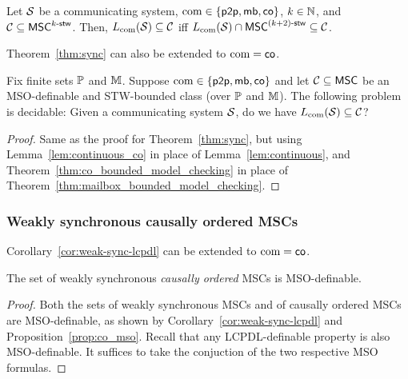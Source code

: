 \documentclass{article}
\begin{document}
\begin{lemma}\label{lem:continuous_co}
Let $\mathcal{S}$ be a communicating system, $\textup{com} \in \{\mathsf{p2p}, \mathsf{mb}, \mathsf{co}\}$,
$k \in \mathbb{N}$, and $\mathcal{C} \subseteq \mathsf{MSC}^{k\textup{-}\mathsf{stw}}$.
Then, $L_{\textup{com}}(\mathcal{S}) \subseteq \mathcal{C}$ iff
$L_{\textup{com}}(\mathcal{S}) \cap \mathsf{MSC}^{(k+2)\textup{-}\mathsf{stw}} \subseteq \mathcal{C}$.
\end{lemma}

Theorem~\ref{thm:sync} can also be extended to $\textup{com} = \mathsf{co}$.

\begin{theorem}\label{thm:sync_co}
Fix finite sets $\mathbb{P}$ and $\mathbb{M}$.
Suppose $\textup{com} \in \{\mathsf{p2p}, \mathsf{mb},\mathsf{co}\}$ and let $\mathcal{C} \subseteq \mathsf{MSC}$ be an MSO-definable and STW-bounded class (over $\mathbb{P}$ and $\mathbb{M}$).
The following problem is decidable:
Given a communicating system $\mathcal{S}$, do we have $L_{\textup{com}}(\mathcal{S}) \subseteq \mathcal{C}$?
\end{theorem}
\begin{proof}
Same as the proof for Theorem~\ref{thm:sync}, but using Lemma~\ref{lem:continuous_co} in place of Lemma~\ref{lem:continuous}, and Theorem~\ref{thm:co_bounded_model_checking} in place of Theorem~\ref{thm:mailbox_bounded_model_checking}.
\end{proof}

\subsubsection{Weakly synchronous causally ordered MSCs}

Corollary~\ref{cor:weak-sync-lcpdl} can  be extended to $\textup{com} = \mathsf{co}$. 

\begin{proposition}\label{cor:co-weak-sync-mso}
The set of weakly synchronous \emph{causally ordered} MSCs is MSO-definable.
\end{proposition}
\begin{proof}
Both the sets of weakly synchronous MSCs and of causally ordered MSCs are MSO-definable, as shown by Corollary~\ref{cor:weak-sync-lcpdl} and Proposition~\ref{prop:co_mso}. Recall that any LCPDL-definable property is also MSO-definable. It suffices to take the conjuction of the two respective MSO formulas.
\end{proof}
\end{document}
